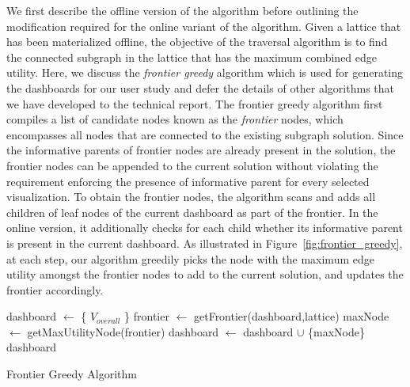  We first describe the offline version of the algorithm before outlining the modification required for the online variant of the algorithm. Given a lattice that has been materialized offline, the objective of the traversal algorithm is to find the connected subgraph in the lattice that has the maximum combined edge utility. Here, we discuss the \textit{frontier greedy} algorithm which is used for generating the dashboards for our user study and defer the details of other algorithms that we have developed to the technical report. The frontier greedy algorithm first compiles a list of candidate nodes known as the \textit{frontier} nodes, which encompasses all nodes that are connected to the existing subgraph solution. Since the informative parents of frontier nodes are already present in the solution, the frontier nodes can be appended to the current solution without violating the requirement enforcing the presence of informative parent for every selected visualization. To obtain the frontier nodes, the algorithm scans and adds all children of leaf nodes of the current dashboard as part of the frontier. In the online version, it additionally checks for each child whether its informative parent is present in the current dashboard. As illustrated in Figure~\ref{fig:frontier_greedy}, at each step, our algorithm greedily picks the node with the maximum edge utility amongst the frontier nodes to add to the current solution, and updates the frontier accordingly. 
\begin{algorithm}
  \begin{algorithmic}[1]
  \State dashboard $\gets$ \{ $V_{overall}$ \}
      \State frontier $\gets$ getFrontier(dashboard,lattice)
      \State maxNode $\gets$ getMaxUtilityNode(frontier)
      \State dashboard $\gets$ dashboard $\cup$ \{maxNode\}
  \EndWhile
  \Return dashboard
  \EndProcedure
  \end{algorithmic}
  \caption{Frontier Greedy Algorithm}\label{algo:frontier_greedy}
\end{algorithm}

